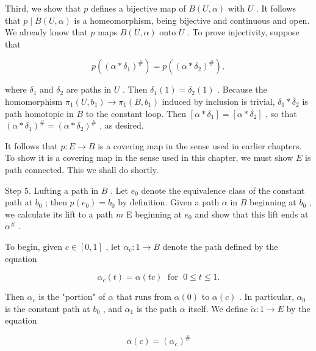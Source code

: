 \documentclass[10pt]{article}
\begin{document}
Third, we show that \(p\) defines a bijective map of \(B\left( {U,\alpha }\right)\) with \(U\) . It follows that \(p \mid  B\left( {U,\alpha }\right)\) is a homeomorphism, being bijective and continuous and open. We already know that \(p\) maps \(B\left( {U,\alpha }\right)\) onto \(U\) . To prove injectivity, suppose that

\[
p\left( {\left( \alpha  * {\delta }_{1}\right) }^{\# }\right)  = p\left( {\left( \alpha  * {\delta }_{2}\right) }^{\# }\right) ,
\]

where \({\delta }_{1}\) and \({\delta }_{2}\) are paths in \(U\) . Then \({\delta }_{1}\left( 1\right)  = {\delta }_{2}\left( 1\right)\) . Because the homomorphism \({\pi }_{1}\left( {U,{b}_{1}}\right)  \rightarrow  {\pi }_{1}\left( {B,{b}_{1}}\right)\) induced by inclusion is trivial, \({\delta }_{1} * {\overline{\delta }}_{2}\) is path homotopic in \(B\) to the constant loop. Then \(\left\lbrack  {\alpha  * {\delta }_{1}}\right\rbrack   = \left\lbrack  {\alpha  * {\delta }_{2}}\right\rbrack\) , so that \({\left( \alpha  * {\delta }_{1}\right) }^{\# } = {\left( \alpha  * {\delta }_{2}\right) }^{\# }\) , as desired.

It follows that \(p : E \rightarrow  B\) is a covering map in the sense used in earlier chapters. To show it is a covering map in the sense used in this chapter, we must show \(E\) is path connected. This we shall do shortly.

Step 5. Lufting a path in \(B\) . Let \({e}_{0}\) denote the equivalence class of the constant path at \({b}_{0}\) ; then \(p\left( {e}_{0}\right)  = {b}_{0}\) by definition. Given a path \(\alpha\) in \(B\) beginning at \({b}_{0}\) , we calculate its lift to a path \(m\) E beginning at \({e}_{0}\) and show that this lift ends at \({\alpha }^{\# }\) .

To begin, given \(c \in  \left\lbrack  {0,1}\right\rbrack\) , let \({\alpha }_{c} : 1 \rightarrow  B\) denote the path defined by the equation

\[
{\alpha }_{c}\left( t\right)  = \alpha \left( {tc}\right) \;\text{ for }\;0 \leq  t \leq  1.
\]

Then \({\alpha }_{c}\) is the "portion" of \(\alpha\) that runs from \(\alpha \left( 0\right)\) to \(\alpha \left( c\right)\) . In particular, \({\alpha }_{0}\) is the constant path at \({b}_{0}\) , and \({\alpha }_{1}\) is the path \(\alpha\) itself. We define \(\widetilde{\alpha } : 1 \rightarrow  E\) by the equation

\[
\overline{\alpha }\left( c\right)  = {\left( {\alpha }_{c}\right) }^{\# }
\]
\end{document}
